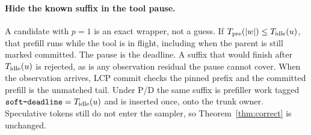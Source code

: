 \paragraph{Hide the known suffix in the tool pause.}
A candidate with $p{=}1$ is an exact wrapper, not a guess.
If $T_{\mathrm{pre}}(|w|)\le T_{\mathrm{idle}}(u)$, that prefill runs while the tool is in flight, including when the parent is still marked committed.
The pause is the deadline.
A suffix that would finish after $T_{\mathrm{idle}}(u)$ is rejected, as is any observation residual the pause cannot cover.
When the observation arrives, LCP commit checks the pinned prefix and the committed prefill is the unmatched tail.
Under P/D the same suffix is prefiller work tagged $\texttt{soft-deadline}=T_{\mathrm{idle}}(u)$ and is inserted once, onto the trunk owner.
Speculative tokens still do not enter the sampler, so Theorem~\ref{thm:correct} is unchanged.
